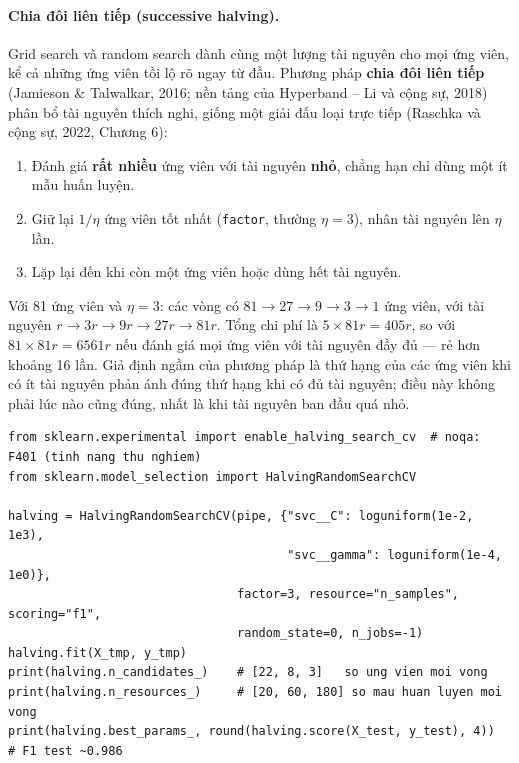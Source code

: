 
\paragraph{Chia đôi liên tiếp (successive halving).} Grid search và random search dành cùng một lượng tài nguyên cho mọi ứng viên, kể cả những ứng viên tồi lộ rõ ngay từ đầu. Phương pháp \textbf{chia đôi liên tiếp} (Jamieson \& Talwalkar, 2016; nền tảng của Hyperband -- Li và cộng sự, 2018) phân bổ tài nguyên thích nghi, giống một giải đấu loại trực tiếp (Raschka và cộng sự, 2022, Chương 6):
\begin{enumerate}
    \item Đánh giá \textbf{rất nhiều} ứng viên với tài nguyên \textbf{nhỏ}, chẳng hạn chỉ dùng một ít mẫu huấn luyện.
    \item Giữ lại $1/\eta$ ứng viên tốt nhất (\texttt{factor}, thường $\eta = 3$), nhân tài nguyên lên $\eta$ lần.
    \item Lặp lại đến khi còn một ứng viên hoặc dùng hết tài nguyên.
\end{enumerate}
Với 81 ứng viên và $\eta = 3$: các vòng có $81 \to 27 \to 9 \to 3 \to 1$ ứng viên, với tài nguyên $r \to 3r \to 9r \to 27r \to 81r$. Tổng chi phí là $5 \times 81r = 405r$, so với $81 \times 81r = 6561r$ nếu đánh giá mọi ứng viên với tài nguyên đầy đủ --- rẻ hơn khoảng 16 lần. Giả định ngầm của phương pháp là thứ hạng của các ứng viên khi có ít tài nguyên phản ánh đúng thứ hạng khi có đủ tài nguyên; điều này không phải lúc nào cũng đúng, nhất là khi tài nguyên ban đầu quá nhỏ.

\begin{lstlisting}[caption={Tìm siêu tham số bằng HalvingRandomSearchCV}]
from sklearn.experimental import enable_halving_search_cv  # noqa: F401 (tinh nang thu nghiem)
from sklearn.model_selection import HalvingRandomSearchCV

halving = HalvingRandomSearchCV(pipe, {"svc__C": loguniform(1e-2, 1e3),
                                       "svc__gamma": loguniform(1e-4, 1e0)},
                                factor=3, resource="n_samples", scoring="f1",
                                random_state=0, n_jobs=-1)
halving.fit(X_tmp, y_tmp)
print(halving.n_candidates_)    # [22, 8, 3]   so ung vien moi vong
print(halving.n_resources_)     # [20, 60, 180] so mau huan luyen moi vong
print(halving.best_params_, round(halving.score(X_test, y_test), 4))   # F1 test ~0.986
\end{lstlisting}

